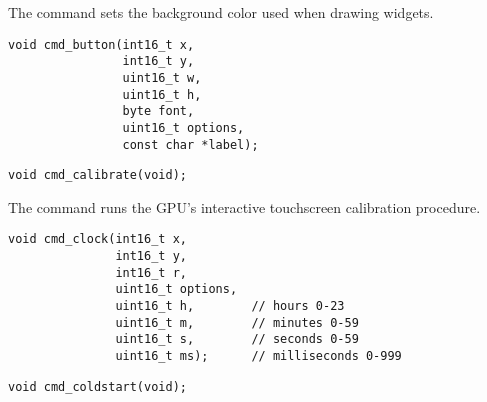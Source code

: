 The  command sets the background color used when drawing widgets.
\style



\begin{framed}
\begin{verbatim}
void cmd_button(int16_t x,
                int16_t y,
                uint16_t w,
                uint16_t h,
                byte font,
                uint16_t options,
                const char *label);
\end{verbatim}
\end{framed}



\begin{framed}
\begin{verbatim}
void cmd_calibrate(void);
\end{verbatim}
\end{framed}

The  command
runs the GPU's interactive touchscreen calibration procedure.




\begin{framed}
\begin{verbatim}
void cmd_clock(int16_t x,
               int16_t y,
               int16_t r,
               uint16_t options,
               uint16_t h,        // hours 0-23
               uint16_t m,        // minutes 0-59
               uint16_t s,        // seconds 0-59
               uint16_t ms);      // milliseconds 0-999
\end{verbatim}
\end{framed}



\begin{framed}
\begin{verbatim}
void cmd_coldstart(void);
\end{verbatim}
\end{framed}

